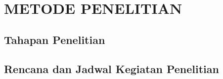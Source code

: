 \chapter{METODE PENELITIAN}

\section{Tahapan Penelitian}

\section{Rencana dan Jadwal Kegiatan Penelitian}